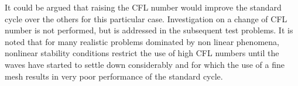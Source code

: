 It could be argued that raising the CFL number would improve the standard
cycle over the others for this particular case. Investigation on a change of
CFL number is not performed, but is addressed in the subsequent test problems.
It is noted that for many realistic problems dominated by non linear phenomena,
nonlinear stability conditions restrict the use of high CFL numbers until the waves
have started to settle down considerably and for which the use
of a fine mesh results in very poor performance of the standard cycle.




